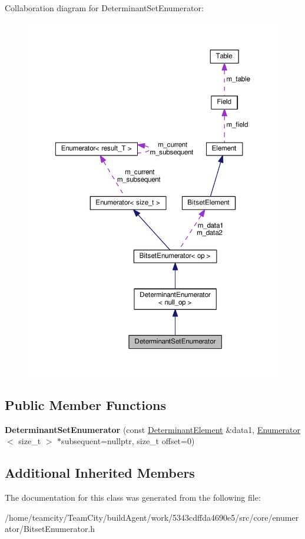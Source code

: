 Collaboration diagram for Determinant\+Set\+Enumerator\+:
\nopagebreak
\begin{figure}[H]
\begin{center}
\leavevmode
\includegraphics[width=350pt]{classDeterminantSetEnumerator__coll__graph}
\end{center}
\end{figure}
\subsection*{Public Member Functions}
\begin{DoxyCompactItemize}
\item 
{\bfseries Determinant\+Set\+Enumerator} (const \hyperlink{classDeterminantElement}{Determinant\+Element} \&data1, \hyperlink{classEnumerator}{Enumerator}$<$ size\+\_\+t $>$ $\ast$subsequent=nullptr, size\+\_\+t offset=0)\hypertarget{classDeterminantSetEnumerator_ad0f4b145140c6f643c0a1d849b2cd527}{}\label{classDeterminantSetEnumerator_ad0f4b145140c6f643c0a1d849b2cd527}

\end{DoxyCompactItemize}
\subsection*{Additional Inherited Members}


The documentation for this class was generated from the following file\+:\begin{DoxyCompactItemize}
\item 
/home/teamcity/\+Team\+City/build\+Agent/work/5343cdffda4690e5/src/core/enumerator/Bitset\+Enumerator.\+h\end{DoxyCompactItemize}
